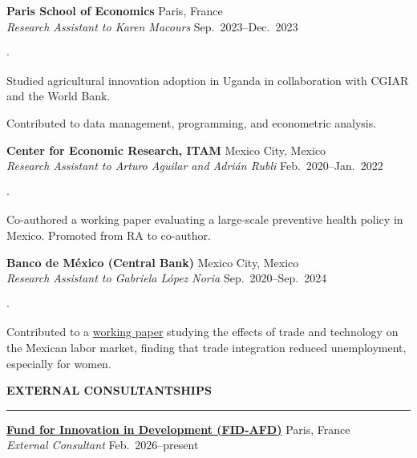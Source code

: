 \documentclass[11pt,letterpaper]{article}
\renewcommand{\section}[1]{%
  \vspace{0.8em}%
  {\large\bfseries\MakeUppercase{#1}}%
  \vspace{0.3em}%
  \hrule%
  \vspace{0.4em}%
}
\newenvironment{citemize}{%
  \begin{list}{$\cdot$}{%
    \setlength{\leftmargin}{1.5em}%
    \setlength{\itemsep}{0pt}%
    \setlength{\parsep}{0pt}%
    \setlength{\topsep}{0.2em}%
    \setlength{\partopsep}{0pt}%
  }%
}{%
  \end{list}%
}
\begin{document}
\textbf{Paris School of Economics} \hfill Paris, France \\
\textit{Research Assistant to Karen Macours} \hfill Sep.\ 2023--Dec.\ 2023

\begin{citemize}
  \item Studied agricultural innovation adoption in Uganda in collaboration with CGIAR and the World Bank.
  \item Contributed to data management, programming, and econometric analysis.
\end{citemize}

\textbf{Center for Economic Research, ITAM} \hfill Mexico City, Mexico \\
\textit{Research Assistant to Arturo Aguilar and Adri\'{a}n Rubli} \hfill Feb.\ 2020--Jan.\ 2022

\begin{citemize}
  \item Co-authored a working paper evaluating a large-scale preventive health policy in Mexico. Promoted from RA to co-author.
\end{citemize}

\textbf{Banco de M\'{e}xico (Central Bank)} \hfill Mexico City, Mexico \\
\textit{Research Assistant to Gabriela L\'{o}pez Noria} \hfill Sep.\ 2020--Sep.\ 2024

\begin{citemize}
  \item Contributed to a \href{https://www.banxico.org.mx/publications-and-press/banco-de-mexico-working-papers/\%7BFE5F557C-DAF1-9E92-0ACA-0312D6BFF8C1\%7D.pdf}{working paper} studying the effects of trade and technology on the Mexican labor market, finding that trade integration reduced unemployment, especially for women.
\end{citemize}


\section{External Consultantships}

\textbf{\href{https://www.afd.fr/en/fund-innovation-development-innovating-against-poverty-and-inequality}{Fund for Innovation in Development (FID-AFD)}} \hfill Paris, France \\
\textit{External Consultant} \hfill Feb.\ 2026--present
\end{document}
